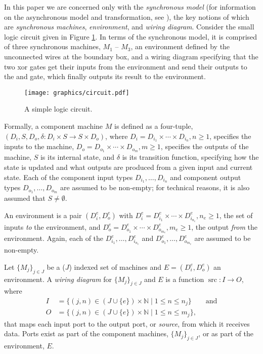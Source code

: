 \documentclass[copyright,creativecommons]{eptcs}
\newcommand{\arrow}{\longrightarrow}
\DeclareMathOperator{\src}{src}
\begin{document}
In this paper we are concerned only with the \emph{synchronous model} (for
information on the asynchronous model and transformation, see
\cite{meseguer_2010_01,meseguer_2009_01}), the key notions of which are \emph{synchronous
machines}, \emph{environment}, and \emph{wiring diagram}. Consider the small
logic circuit given in Figure \ref{fig:circuit}. In terms of the synchronous
model, it is comprised of three synchronous machines, $M_1$ -- $M_3$, an
environment defined by the unconnected wires at the boundary box, and a wiring
diagram specifying that the two xor gates get their inputs from the environment
and send their outputs to the and gate, which finally outputs its result to the
environment.

\begin{figure}
\begin{center}
\texttt{[image: graphics/circuit.pdf]}
\end{center}
\caption{A simple logic circuit.}
\label{fig:circuit}
\end{figure}
 
Formally, a component machine $M$ is defined as a four-tuple, $(D_i, S, D_o,
\delta : D_i \times S \arrow S \times D_o)$, where $D_i = D_{i_1} \times \dotsb
\times D_{i_n}, n \geq 1$, specifies the inputs to the machine, $D_o = D_{o_1}
\times \dotsb \times D_{o_m}, m \geq 1$, specifies the outputs of the machine,
$S$ is its internal state, and $\delta$ is its transition function, specifying
how the state is updated and what outputs are produced from a given input and
current state. Each of the component input types $D_{i_1},\dotsc,D_{i_n}$ and
component output types $D_{o_1},\dotsc,D_{o_m}$ are assumed to be non-empty; for
technical reasons, it is also assumed that $S \neq \emptyset$.

An environment is a pair $(D^e_i,D^e_o)$ with $D^e_i = D^e_{i_1} \times \dotsb
\times D^e_{i_{n_e}}, n_e \geq 1$, the set of inputs \emph{to} the environment,
and $D^e_o = D^e_{o_1} \times \dotsb \times D^e_{o_{m_e}}, m_e \geq 1$, the output
\emph{from} the environment.  Again, each of the
$D^e_{i_1},\dotsc,D^e_{i_{n_e}}$ and $D^e_{o_1},\dotsc,D^e_{o_{m_e}}$ are
assumed to be non-empty.

Let $\{M_j\}_{j \in J}$ be a ($J$) indexed set of machines and $E =
(D^e_i,D^e_o)$ an environment. A \emph{wiring diagram} for $\{M_j\}_{j \in J}$
and $E$ is a function $\src : I \arrow O$, where 
\begin{align*}
I &= \{ (j,n) \in (J \cup \{e\}) \times \mathbb{N} \mid 1 \leq n \leq n_{j}\} \qquad \text{and} \\
O &= \{ (j,n) \in (J \cup \{e\}) \times \mathbb{N} \mid 1 \leq n \leq m_{j}\},
\end{align*}
that maps each input port to the output port, or \emph{source}, from which it
receives data. Ports exist as part of the component machines, $\{M_j\}_{j \in
J}$, or as part of the environment, $E$.
\end{document}
